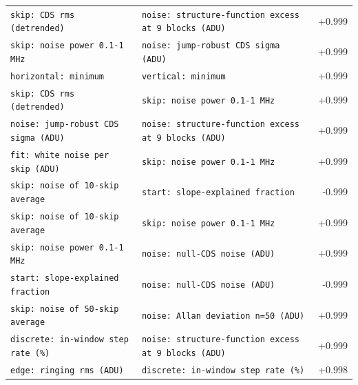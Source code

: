 \documentclass[10pt]{article}
\renewcommand{\_}{\oldunderscore\allowbreak}
\begin{document}
\begin{longtable}{>{\raggedright\arraybackslash}p{}>{\raggedright\arraybackslash}p{}r}
\texttt{skip: CDS rms (detrended)} & \texttt{noise: structure-function excess at 9 blocks (ADU)} & +0.999 \\
\texttt{skip: noise power 0.1-1 MHz} & \texttt{noise: jump-robust CDS sigma (ADU)} & +0.999 \\
\texttt{horizontal: minimum} & \texttt{vertical: minimum} & +0.999 \\
\texttt{skip: CDS rms (detrended)} & \texttt{skip: noise power 0.1-1 MHz} & +0.999 \\
\texttt{noise: jump-robust CDS sigma (ADU)} & \texttt{noise: structure-function excess at 9 blocks (ADU)} & +0.999 \\
\texttt{fit: white noise per skip (ADU)} & \texttt{skip: noise power 0.1-1 MHz} & +0.999 \\
\texttt{skip: noise of 10-skip average} & \texttt{start: slope-explained fraction} & -0.999 \\
\texttt{skip: noise of 10-skip average} & \texttt{skip: noise power 0.1-1 MHz} & +0.999 \\
\texttt{skip: noise power 0.1-1 MHz} & \texttt{noise: null-CDS noise (ADU)} & +0.999 \\
\texttt{start: slope-explained fraction} & \texttt{noise: null-CDS noise (ADU)} & -0.999 \\
\texttt{skip: noise of 50-skip average} & \texttt{noise: Allan deviation n=50 (ADU)} & +0.999 \\
\texttt{discrete: in-window step rate (\%)} & \texttt{noise: structure-function excess at 9 blocks (ADU)} & +0.999 \\
\texttt{edge: ringing rms (ADU)} & \texttt{discrete: in-window step rate (\%)} & +0.998 \\
\end{longtable}
\end{document}
